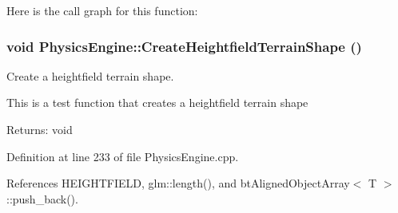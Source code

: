 Here is the call graph for this function:\hypertarget{class_physics_engine_f951fe2e462f4b487b653199298a1bb3}{
\subsubsection[CreateHeightfieldTerrainShape]{\setlength{\rightskip}{0pt plus 5cm}void PhysicsEngine::CreateHeightfieldTerrainShape ()}}
\label{class_physics_engine_f951fe2e462f4b487b653199298a1bb3}


Create a heightfield terrain shape. 

This is a test function that creates a heightfield terrain shape

\begin{Desc}
\item[Returns:]void \end{Desc}


Definition at line 233 of file PhysicsEngine.cpp.

References HEIGHTFIELD, glm::length(), and btAlignedObjectArray$<$ T $>$::push\_\-back().

